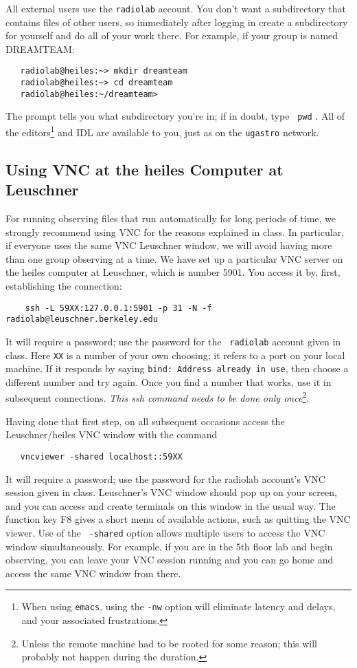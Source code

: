 \documentclass[psfig,preprint]{aastex}
\begin{document}
All external users use the {\tt radiolab} account. You don't
want a subdirectory that contains files of other users, so immediately
after logging in create a subdirectory for yourself and do all of your
work there. For example, if your group is named DREAMTEAM: 
\begin{verbatim}
   radiolab@heiles:~> mkdir dreamteam
   radiolab@heiles:~> cd dreamteam
   radiolab@heiles:~/dreamteam> 
\end{verbatim}
The prompt tells you what subdirectory you're in; if in doubt, type {\tt
  pwd} . All of the editors\footnote{When using {\tt emacs}, using the
  {\tt -nw} option will eliminate latency and delays, and your
  associated frustrations.} and IDL are available to you, just as on the
{\tt ugastro} network.

\subsection {Using VNC at the heiles Computer at Leuschner}
For running observing files that run automatically for long periods of
time, we strongly recommend using VNC for the reasons explained in
class. In particular, if everyone uses the same VNC Leuschner window, we
will avoid having more than one group observing at a time. We have set
up a particular VNC server on the heiles computer at Leuschner, which is
number 5901. You access it by, first, establishing the connection:
\begin{verbatim}
    ssh -L 59XX:127.0.0.1:5901 -p 31 -N -f radiolab@leuschner.berkeley.edu
\end{verbatim}
\noindent It will require a password; use the password for the {\tt
  radiolab} account given in class. Here {\tt XX} is a number of your
own choosing; it refers to a port on your local machine. If it responds
by saying {\tt bind: Address already in use}, then choose a different
number and try again. Once you find a number that works, use it in
subsequent connections. {\it This ssh command needs to be done only
  once}\footnote{Unless the remote machine had to be rooted for some
  reason; this will probably not happen during the duration.}. 

Having done that first step, on all subsequent occasions access the
Leuschner/heiles VNC window with the command
\begin{verbatim}
   vncviewer -shared localhost::59XX
\end{verbatim}
\noindent It will require a password; use the password for the radiolab
account's VNC session given in class. Leuschner's VNC window should pop
up on your screen, and you can access and create terminals on this
window in the usual way. The function key F8 gives a short menu of
available actions, such as quitting the VNC viewer. Use of the {\tt
  -shared} option allows multiple users to access the VNC window
simultaneously. For example, if you are in the 5th floor lab and begin
observing, you can leave your VNC session running and you can go home
and access the same VNC window from there. 
\end{document}
